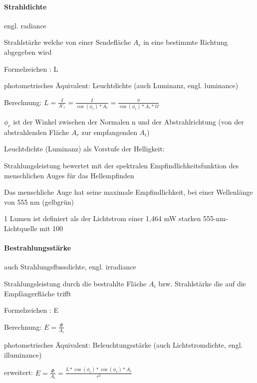 \documentclass[landscape]{article}
\begin{document}
\begin{multicols}{3}
  \paragraph{Strahldichte}
  \begin{itemize*}
    \item engl. radiance
    \item Strahlstärke welche von einer Sendefläche $A_r$ in eine bestimmte Richtung abgegeben wird
    \item Formelzeichen : L
    \item photometrisches Äquivalent: Leuchtdichte (auch Luminanz, engl. luminance)
    \item Berechnung: $L = \frac{I}{A'_r}=\frac{I}{\cos(\phi_r)*A_r} = \frac{\phi}{\cos(\phi_r)*A_r*\Omega}$
    \item $\phi_r$ ist der Winkel zwischen der Normalen n und der Abstrahlrichtung (von der abstrahlenden Fläche $A_r$ zur empfangenden $A_i$)
  \end{itemize*}
  
  Leuchtdichte (Luminanz) als Vorstufe der Helligkeit:
  \begin{itemize*}
    \item Strahlungsleistung bewertet mit der spektralen Empfindlichkeitsfunktion des menschlichen Auges für das Hellempfinden
    \item Das menschliche Auge hat seine maximale Empfindlichkeit, bei einer Wellenlänge von 555 nm (gelbgrün)
    \item 1 Lumen ist definiert als der Lichtstrom einer 1,464 mW starken 555-nm-Lichtquelle mit 100%
  \end{itemize*}
  
  
  \paragraph{Bestrahlungsstärke}
  \begin{itemize*}
    \item auch Strahlungsflussdichte, engl. irradiance
    \item Strahlungsleistung durch die bestrahlte Fläche $A_i$ bzw. Strahlstärke die auf die Empfängerfläche trifft
    \item Formelzeichen : E
    \item Berechnung: $E =\frac{\Phi}{A_i}$
    \item photometrisches Äquivalent: Beleuchtungsstärke (auch Lichtstromdichte, engl. illuminance)
    \item erweitert: $E=\frac{\Phi}{A_i}=\frac{L*\cos(\phi_i)*\cos(\phi_r)*A_r}{r^2}$
  \end{itemize*}
  

\end{multicols}
\end{document}
